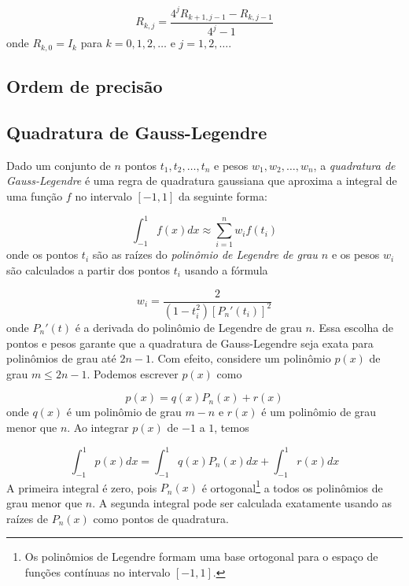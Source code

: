 \documentclass{article}
\begin{document}
\begin{equation}
    R_{k, j} = \frac{4^j R_{k+1, j-1} - R_{k, j-1}}{4^j - 1}
\end{equation}
onde \(R_{k, 0} = I_k\) para \(k = 0, 1, 2, \ldots\) e \(j = 1, 2, \ldots\).

\subsection{Ordem de precisão}
\subsection{Quadratura de Gauss-Legendre}

Dado um conjunto de \(n\) pontos \(t_1, t_2, \ldots, t_n\) e pesos \(w_1, w_2, \ldots, w_n\), a \emph{quadratura de Gauss-Legendre} é uma regra de quadratura gaussiana que aproxima a integral de uma função \(f\) no intervalo \([-1, 1]\) da seguinte forma:

\begin{equation}
    \int_{-1}^{1} f(x) dx \approx \sum_{i=1}^{n} w_i f(t_i)
\end{equation}
onde os pontos \(t_i\) são as raízes do \emph{polinômio de Legendre de grau \(n\)} e os pesos \(w_i\) são calculados a partir dos pontos \(t_i\) usando a fórmula

\begin{equation}
    w_i = \frac{2}{(1 - t_i^2)[P_n'(t_i)]^2}
\end{equation}
onde \(P_n'(t)\) é a derivada do polinômio de Legendre de grau \(n\). Essa escolha de pontos e pesos garante que a quadratura de Gauss-Legendre seja exata para polinômios de grau até \(2n-1\). Com efeito, considere um polinômio \(p(x)\) de grau \(m \leq 2n-1\). Podemos escrever \(p(x)\) como

\begin{equation}
    p(x) = q(x) P_n(x) + r(x)
\end{equation}
onde \(q(x)\) é um polinômio de grau \(m-n\) e \(r(x)\) é um polinômio de grau menor que \(n\). Ao integrar \(p(x)\) de \(-1\) a \(1\), temos

\begin{equation}
    \int_{-1}^{1} p(x) dx = \int_{-1}^{1} q(x) P_n(x) dx + \int_{-1}^{1} r(x) dx
\end{equation}
A primeira integral é zero, pois \(P_n(x)\) é ortogonal\footnote{Os polinômios de Legendre formam uma base ortogonal para o espaço de funções contínuas no intervalo \([-1, 1]\).} a todos os polinômios de grau menor que \(n\). A segunda integral pode ser calculada exatamente usando as raízes de \(P_n(x)\) como pontos de quadratura.
\end{document}
